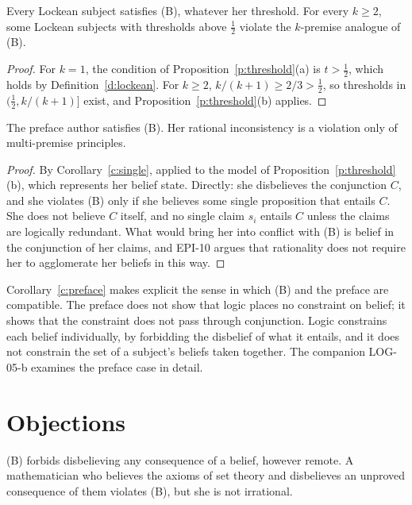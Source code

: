 \documentclass{situationist-preprint}
\begin{document}
\begin{corollary}\label{c:single}
Every Lockean subject satisfies (B), whatever her threshold. For every $k \geq 2$, some Lockean subjects with thresholds above $\tfrac12$ violate the $k$-premise analogue of (B).
\end{corollary}

\begin{proof}
For $k = 1$, the condition of Proposition~\ref{p:threshold}(a) is $t > \tfrac12$, which holds by Definition~\ref{d:lockean}. For $k \geq 2$, $k/(k+1) \geq 2/3 > \tfrac12$, so thresholds in $(\tfrac12, k/(k+1)]$ exist, and Proposition~\ref{p:threshold}(b) applies.
\end{proof}

\begin{corollary}\label{c:preface}
The preface author satisfies (B). Her rational inconsistency is a violation only of multi-premise principles.
\end{corollary}

\begin{proof}
By Corollary~\ref{c:single}, applied to the model of Proposition~\ref{p:threshold}(b), which represents her belief state. Directly: she disbelieves the conjunction $C$, and she violates (B) only if she believes some single proposition that entails $C$. She does not believe $C$ itself, and no single claim $s_i$ entails $C$ unless the claims are logically redundant. What would bring her into conflict with (B) is belief in the conjunction of her claims, and EPI-10 argues that rationality does not require her to agglomerate her beliefs in this way.
\end{proof}

Corollary~\ref{c:preface} makes explicit the sense in which (B) and the preface are compatible. The preface does not show that logic places no constraint on belief; it shows that the constraint does not pass through conjunction. Logic constrains each belief individually, by forbidding the disbelief of what it entails, and it does not constrain the set of a subject's beliefs taken together. The companion LOG-05-b examines the preface case in detail.

\section{Objections}

\begin{objection}
(B) forbids disbelieving any consequence of a belief, however remote. A mathematician who believes the axioms of set theory and disbelieves an unproved consequence of them violates (B), but she is not irrational.
\end{objection}
\end{document}
